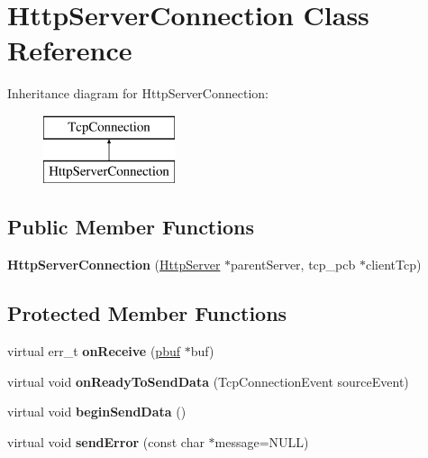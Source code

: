 \hypertarget{class_http_server_connection}{}\section{Http\+Server\+Connection Class Reference}
\label{class_http_server_connection}
Inheritance diagram for Http\+Server\+Connection\+:\begin{figure}[H]
\begin{center}
\leavevmode
\includegraphics[height=2.000000cm]{class_http_server_connection}
\end{center}
\end{figure}
\subsection*{Public Member Functions}
\begin{DoxyCompactItemize}
\item 
\hypertarget{class_http_server_connection_a932d7972bfb9cc55785bca493a64fc81}{}{\bfseries Http\+Server\+Connection} (\hyperlink{class_http_server}{Http\+Server} $\ast$parent\+Server, tcp\+\_\+pcb $\ast$client\+Tcp)\label{class_http_server_connection_a932d7972bfb9cc55785bca493a64fc81}

\end{DoxyCompactItemize}
\subsection*{Protected Member Functions}
\begin{DoxyCompactItemize}
\item 
\hypertarget{class_http_server_connection_ae758702ac20ec7bbd48955fe58619580}{}virtual err\+\_\+t {\bfseries on\+Receive} (\hyperlink{structpbuf}{pbuf} $\ast$buf)\label{class_http_server_connection_ae758702ac20ec7bbd48955fe58619580}

\item 
\hypertarget{class_http_server_connection_afba7fcad9ff3ed848eaba6a807c35cdd}{}virtual void {\bfseries on\+Ready\+To\+Send\+Data} (Tcp\+Connection\+Event source\+Event)\label{class_http_server_connection_afba7fcad9ff3ed848eaba6a807c35cdd}

\item 
\hypertarget{class_http_server_connection_a5e3e907b120513dac55004bafa61a39b}{}virtual void {\bfseries begin\+Send\+Data} ()\label{class_http_server_connection_a5e3e907b120513dac55004bafa61a39b}

\item 
\hypertarget{class_http_server_connection_acbd41eed522aca1b478cb723ef02736b}{}virtual void {\bfseries send\+Error} (const char $\ast$message=N\+U\+L\+L)\label{class_http_server_connection_acbd41eed522aca1b478cb723ef02736b}

\end{DoxyCompactItemize}
